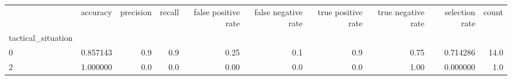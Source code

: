 \begin{tabular}{lrrrrrrrrr}
\toprule
{} &  accuracy &  precision &  recall &  false positive rate &  false negative rate &  true positive rate &  true negative rate &  selection rate &  count \\
tactical\_situation &           &            &         &                      &                      &                     &                     &                 &        \\
\midrule
0                  &  0.857143 &        0.9 &     0.9 &                 0.25 &                  0.1 &                 0.9 &                0.75 &        0.714286 &   14.0 \\
2                  &  1.000000 &        0.0 &     0.0 &                 0.00 &                  0.0 &                 0.0 &                1.00 &        0.000000 &    1.0 \\
\bottomrule
\end{tabular}
